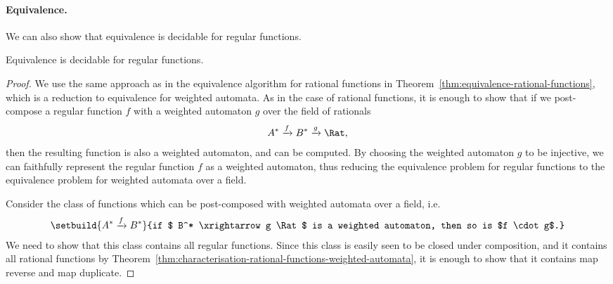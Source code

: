 \paragraph*{Equivalence.} We can also show that equivalence is decidable for regular functions.
\begin{theorem}\label{thm:decidable-equivalence-regular}
    Equivalence is decidable for regular functions.
\end{theorem}
\begin{proof}
    We use the same approach as in the equivalence algorithm for rational functions in Theorem~\ref{thm:equivalence-rational-functions}, which is a reduction to equivalence for weighted automata. As in the case of rational functions, it is enough to show that if we post-compose a regular function $f$ with a weighted automaton $g$ over the field of rationals
    \begin{align*}
    A^* \xrightarrow f B^* \xrightarrow g \Rat,
    \end{align*}
    then the resulting function  is also a weighted automaton, and can be computed. By choosing the weighted automaton $g$ to be injective, we can faithfully represent the regular function $f$ as a weighted automaton, thus reducing the equivalence problem for regular functions to the equivalence problem for weighted automata over a field.

    Consider the class of functions which can be post-composed with weighted automata over a field, i.e.~
    \begin{align*}
    \setbuild{ A^* \xrightarrow f B^*}{if $ B^* \xrightarrow g \Rat$ is a weighted automaton, then so is $f \cdot g$.}
    \end{align*}
    We need to show that this class contains all regular functions. Since this class is easily seen to be closed under composition, and it contains all rational functions by Theorem~\ref{thm:characterisation-rational-functions-weighted-automata}, it is enough to show that it contains map reverse and map duplicate.



\end{proof}
